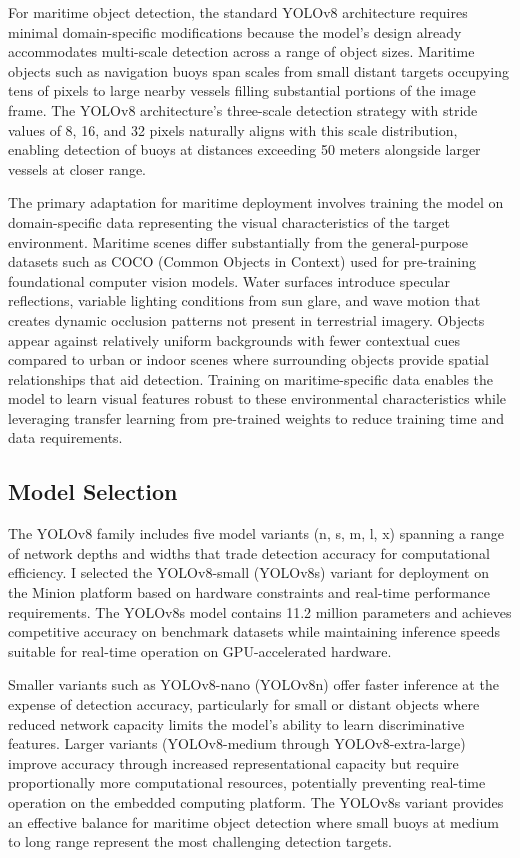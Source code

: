 For maritime object detection, the standard YOLOv8 architecture requires minimal domain-specific modifications because the model's design already accommodates multi-scale detection across a range of object sizes.
Maritime objects such as navigation buoys span scales from small distant targets occupying tens of pixels to large nearby vessels filling substantial portions of the image frame.
The YOLOv8 architecture's three-scale detection strategy with stride values of 8, 16, and 32 pixels naturally aligns with this scale distribution, enabling detection of buoys at distances exceeding 50 meters alongside larger vessels at closer range.

The primary adaptation for maritime deployment involves training the model on domain-specific data representing the visual characteristics of the target environment.
Maritime scenes differ substantially from the general-purpose datasets such as COCO (Common Objects in Context) used for pre-training foundational computer vision models.
Water surfaces introduce specular reflections, variable lighting conditions from sun glare, and wave motion that creates dynamic occlusion patterns not present in terrestrial imagery.
Objects appear against relatively uniform backgrounds with fewer contextual cues compared to urban or indoor scenes where surrounding objects provide spatial relationships that aid detection.
Training on maritime-specific data enables the model to learn visual features robust to these environmental characteristics while leveraging transfer learning from pre-trained weights to reduce training time and data requirements.

\subsection{Model Selection} \label{sec:yolo_model_selection}

The YOLOv8 family includes five model variants (n, s, m, l, x) spanning a range of network depths and widths that trade detection accuracy for computational efficiency.
I selected the YOLOv8-small (YOLOv8s) variant for deployment on the Minion platform based on hardware constraints and real-time performance requirements.
The YOLOv8s model contains 11.2 million parameters and achieves competitive accuracy on benchmark datasets while maintaining inference speeds suitable for real-time operation on GPU-accelerated hardware.

Smaller variants such as YOLOv8-nano (YOLOv8n) offer faster inference at the expense of detection accuracy, particularly for small or distant objects where reduced network capacity limits the model's ability to learn discriminative features.
Larger variants (YOLOv8-medium through YOLOv8-extra-large) improve accuracy through increased representational capacity but require proportionally more computational resources, potentially preventing real-time operation on the embedded computing platform.
The YOLOv8s variant provides an effective balance for maritime object detection where small buoys at medium to long range represent the most challenging detection targets.

